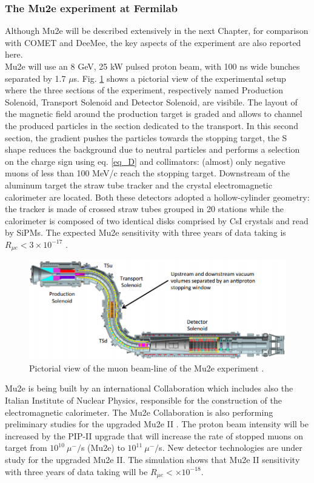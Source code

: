 \documentclass[12pt,a4paper,openright, oneside, titlepage]{book} %
\begin{document}
\subsubsection{The Mu2e experiment at Fermilab}
Although Mu2e will be described extensively in the next Chapter, for comparison with COMET and DeeMee,
the key aspects of the experiment are also reported here.\\
Mu2e will use an 8 GeV, 25 kW pulsed proton beam, with 100 ns wide bunches separated by 1.7 $\mu$s.  
Fig. \ref{_MuonBeamline} shows a pictorial view of the experimental setup 
where the three sections of the experiment, respectively named
Production Solenoid, Transport Solenoid and Detector Solenoid, are visibile.  
The layout of the magnetic field around the production target is graded and allows to channel the produced particles in the section dedicated to the transport. 
In this second section, the gradient pushes the particles towards the stopping target, the S shape reduces the background 
due to neutral particles and performs a selection on the charge sign using eq. \ref{eq_D} and collimators: (almost) only negative muons of less than 100 MeV/c reach the stopping target. Downstream of the aluminum target the straw tube tracker and the crystal electromagnetic calorimeter are located. Both these detectors adopted a hollow-cylinder geometry: 
the tracker is made of crossed straw tubes grouped in 20 stations 
while the calorimeter is composed of two identical disks comprised by CsI crystals and read by SiPMs.
The expected Mu2e sensitivity with three years of data taking is $R_{\mu e}<3\times10^{-17}$ \cite{MTDR}.



\begin{figure}[h!]
\centering
\includegraphics[scale=0.8]{MuonBeamline}
\caption{Pictorial view of the muon beam-line of the Mu2e experiment \cite{MTDR}.}
\label{_MuonBeamline}
\end{figure}

\noindent
Mu2e is being built by an international Collaboration which includes also the Italian Institute of Nuclear Physics,
responsible for the construction of the electromagnetic calorimeter.
The Mu2e Collaboration is also performing preliminary studies for the upgraded Mu2e II
\cite{Mu2e_II:2018}. 
The proton beam intensity will be increased by the PIP-II upgrade \cite{PIP_II:2018} 
that will increase the rate of stopped muons on target from $10^{10}\ \mu^-/$s (Mu2e) 
to $10^{11}\ \mu^-/$s. New detector technologies are under study for the upgraded Mu2e II.
The simulation shows that Mu2e II
sensitivity with three years of data taking will be $R_{\mu e} < \times10^{-18}$.
\end{document}
